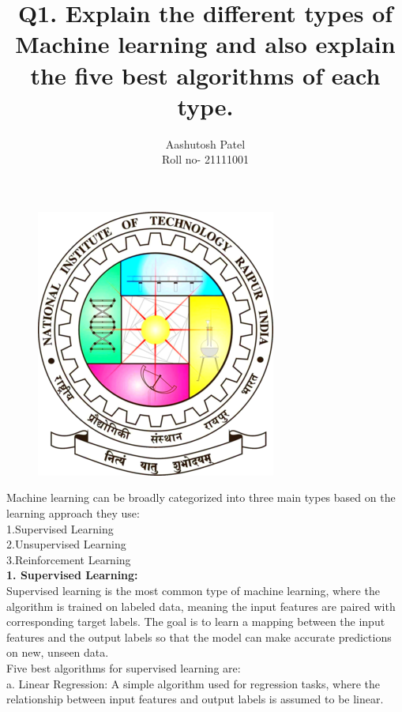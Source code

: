 \documentclass[a4paper,12pt]{article}
\author{Aashutosh Patel \\ Roll no- 21111001}
\begin{document}
	\begin{figure}
		\centering
		\includegraphics[scale=0.6]{nitlogo.png}
	\end{figure}
	\maketitle
	\clearpage
	
\title{\textbf{Q1. Explain the different types of Machine learning and also explain the five best algorithms of each type.}}


Machine learning can be broadly categorized into three main types based on the learning approach they use:\\
1.Supervised Learning\\
2.Unsupervised Learning\\
3.Reinforcement Learning\\

\textbf{1. Supervised Learning:}\\
Supervised learning is the most common type of machine learning, where the algorithm is trained on labeled data, meaning the input features are paired with corresponding target labels. The goal is to learn a mapping between the input features and the output labels so that the model can make accurate predictions on new, unseen data.\\

Five best algorithms for supervised learning are:\\

a. Linear Regression: A simple algorithm used for regression tasks, where the relationship between input features and output labels is assumed to be linear.\\
\end{document}
